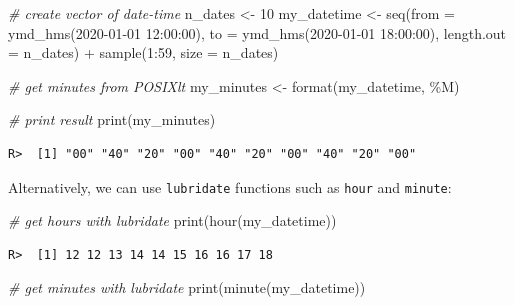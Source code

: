 \documentclass[
  12pt,
]{book}
\newenvironment{Shaded}{\begin{snugshade}}{\end{snugshade}}
\newcommand{\AttributeTok}[1]{\textcolor[rgb]{0.61,0.61,0.61}{#1}}
\newcommand{\CommentTok}[1]{\textcolor[rgb]{0.37,0.37,0.37}{\textit{#1}}}
\newcommand{\DecValTok}[1]{\textcolor[rgb]{0.06,0.06,0.06}{#1}}
\newcommand{\FunctionTok}[1]{\textcolor[rgb]{0,0,0}{#1}}
\newcommand{\NormalTok}[1]{#1}
\newcommand{\OtherTok}[1]{\textcolor[rgb]{0.37,0.37,0.37}{#1}}
\newcommand{\SpecialCharTok}[1]{\textcolor[rgb]{0,0,0}{#1}}
\newcommand{\StringTok}[1]{\textcolor[rgb]{0.5,0.5,0.5}{#1}}
\begin{document}
\begin{Shaded}
\begin{Highlighting}[]
\CommentTok{\# create vector of date{-}time}
\NormalTok{n\_dates }\OtherTok{\textless{}{-}} \DecValTok{10}
\NormalTok{my\_datetime }\OtherTok{\textless{}{-}} \FunctionTok{seq}\NormalTok{(}\AttributeTok{from =} \FunctionTok{ymd\_hms}\NormalTok{(}\StringTok{\textquotesingle{}2020{-}01{-}01 12:00:00\textquotesingle{}}\NormalTok{),}
                   \AttributeTok{to =} \FunctionTok{ymd\_hms}\NormalTok{(}\StringTok{\textquotesingle{}2020{-}01{-}01 18:00:00\textquotesingle{}}\NormalTok{),}
                   \AttributeTok{length.out =}\NormalTok{ n\_dates) }\SpecialCharTok{+} \FunctionTok{sample}\NormalTok{(}\DecValTok{1}\SpecialCharTok{:}\DecValTok{59}\NormalTok{, }
                                                  \AttributeTok{size =}\NormalTok{ n\_dates)}

\CommentTok{\# get minutes from POSIXlt}
\NormalTok{my\_minutes }\OtherTok{\textless{}{-}} \FunctionTok{format}\NormalTok{(my\_datetime, }\StringTok{\textquotesingle{}\%M\textquotesingle{}}\NormalTok{)}

\CommentTok{\# print result}
\FunctionTok{print}\NormalTok{(my\_minutes)}
\end{Highlighting}
\end{Shaded}

\begin{verbatim}
R>  [1] "00" "40" "20" "00" "40" "20" "00" "40" "20" "00"
\end{verbatim}

Alternatively, we can use \texttt{lubridate} functions such as \texttt{hour} and \texttt{minute}:  

\begin{Shaded}
\begin{Highlighting}[]
\CommentTok{\# get hours with lubridate}
\FunctionTok{print}\NormalTok{(}\FunctionTok{hour}\NormalTok{(my\_datetime))}
\end{Highlighting}
\end{Shaded}

\begin{verbatim}
R>  [1] 12 12 13 14 14 15 16 16 17 18
\end{verbatim}

\begin{Shaded}
\begin{Highlighting}[]
\CommentTok{\# get minutes with lubridate}
\FunctionTok{print}\NormalTok{(}\FunctionTok{minute}\NormalTok{(my\_datetime))}
\end{Highlighting}
\end{Shaded}
\end{document}
